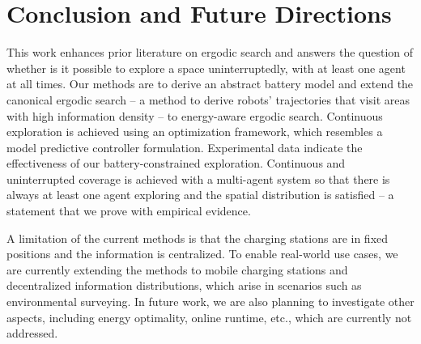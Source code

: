 \documentclass[letterpaper,10pt,conference,twoside]{IEEEtran}
\theoremstyle{definition}
\begin{document}
\section{Conclusion and Future Directions}\label{sec:conc}
\noindent
This work enhances prior literature on ergodic search and %
answers the question of whether is it possible to explore a space uninterruptedly, with at least one agent at all times. %
Our methods are to derive an abstract battery model and extend the canonical ergodic search -- a method to derive robots' trajectories that visit areas with high information density -- to energy-aware ergodic search. Continuous exploration is achieved using an %
optimization framework, which resembles a model predictive controller formulation. 
Experimental data indicate the effectiveness of our battery-constrained exploration. Continuous and uninterrupted coverage is achieved with a multi-agent system so that there is always at least one agent exploring and the spatial distribution is satisfied -- a statement that we prove with empirical evidence.

A limitation of the current methods is that the charging stations are in fixed positions and the information is centralized. To enable real-world use cases, we are currently extending the methods to mobile charging stations and decentralized information distributions, which arise in scenarios such as environmental surveying. In future work, we are also planning to investigate other aspects, including energy optimality, online runtime, etc., which are currently not addressed. %

{\small
 

}
\end{document}
